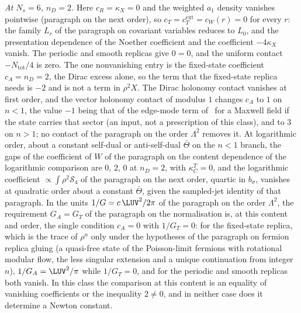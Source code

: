 \emph{At \(N_s=6\), \(n_D=2\).} Here \(c_R=\kappa_X=0\) and the weighted \(a_1\) density vanishes pointwise (paragraph on the next order), so \(c_T=c_T^{\mathrm{ext}}=c_W(r)=0\) for every \(r\): the family \(L_r\) of the paragraph on covariant variables reduces to \(L_0\), and the presentation dependence of the Noether coefficient and the coefficient \(-4\kappa_X\) vanish. The periodic and smooth replicas give \(0=0\), and the uniform contact \(-N_{\mathrm{tot}}/4\) is zero. The one nonvanishing entry is the fixed-state coefficient \(c_A=n_D=2\), the Dirac excess alone, so the term that the fixed-state replica needs is \(-2\) and is not a term in \(\rho^2X\). The Dirac holonomy contact vanishes at first order, and the vector holonomy contact of modulus \(1\) changes \(c_A\) to \(1\) on \(n<1\), the value \(-1\) being that of the edge-mode term of~\cite{DonnellyWall2016} for a Maxwell field if the state carries that sector (an input, not a prescription of this class), and to \(3\) on \(n>1\); no contact of the paragraph on the order \(\Lambda^2\) removes it. At logarithmic order, about a constant self-dual or anti-self-dual \(\bar\Theta\) on the \(n<1\) branch, the gaps of the coefficient of \(W\) of the paragraph on the content dependence of the logarithmic comparison are \(0\), \(2\), \(0\) at \(n_D=2\), with \(\kappa_C^T=0\), and the logarithmic coefficient \(\propto\int\rho^2\mathcal S_4\) of the paragraph on the next order, quartic in \(b_\sigma\), vanishes at quadratic order about a constant \(\bar\Theta\), given the sampled-jet identity of that paragraph. In the units \(1/G=c\,\LUV^2/2\pi\) of the paragraph on the order \(\Lambda^2\), the requirement \(G_A=G_T\) of the paragraph on the normalisation is, at this content and order, the single condition \(c_A=0\) with \(1/G_T=0\): for the fixed-state replica, which is the trace of \(\rho^n\) only under the hypotheses of the paragraph on fermion replica gluing (a quasi-free state of the Poisson-limit fermions with rotational modular flow, the less singular extension and a unique continuation from integer \(n\)), \(1/G_A=\LUV^2/\pi\) while \(1/G_T=0\), and for the periodic and smooth replicas both vanish. In this class the comparison at this content is an equality of vanishing coefficients or the inequality \(2\neq0\), and in neither case does it determine a Newton constant.

